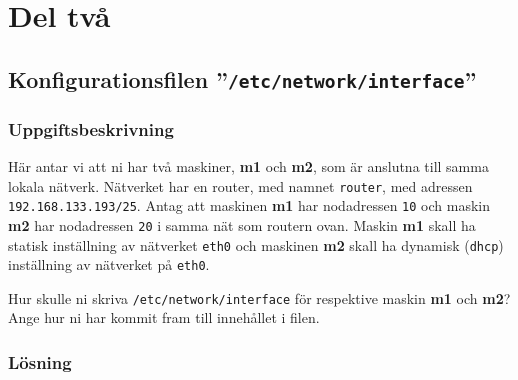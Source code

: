 %
%
%


\section{Del två}


\subsection{Konfigurationsfilen ''\texttt{/etc/network/interface}''}
\subsubsection{Uppgiftsbeskrivning}
Här antar vi att ni har två maskiner, \textbf{m1} och \textbf{m2}, som är
anslutna till samma lokala nätverk.  Nätverket har en router, med namnet
\texttt{router}, med adressen \texttt{192.168.133.193/25}. Antag att maskinen
\textbf{m1} har nodadressen \texttt{10} och maskin \textbf{m2} har nodadressen
\texttt{20} i samma nät som routern ovan. Maskin \textbf{m1} skall ha statisk
inställning av nätverket \texttt{eth0} och maskinen \textbf{m2} skall ha
dynamisk (\texttt{dhcp}) inställning av nätverket på \texttt{eth0}.

Hur skulle ni skriva \texttt{/etc/network/interface} för respektive maskin
\textbf{m1} och \textbf{m2}?  Ange hur ni har kommit fram till innehållet i
filen.

\subsubsection{Lösning}

